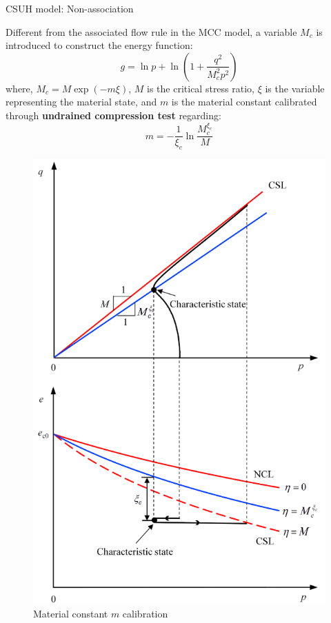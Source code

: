 \documentclass[aspectratio=169]{beamer}
\begin{document}
\begin{frame}{CSUH model: Non-association}
    \fontsize{10}{10}\selectfont
    \begin{minipage}[c]{0.50\linewidth}
        Different from the associated flow rule in the MCC model, a variable $M_c$ is introduced to construct the energy function:
    \begin{equation}
        g = \ln{p} + \ln{\left( 1+ \frac{q^2}{M_c^2 p^2}\right)}
        \label{eq: energy function in the CSUH model}
    \end{equation}
    where, $M_c=M\exp\left({-m\xi}\right)$, $M$ is the critical stress ratio, $\xi$ is the variable representing the material state, and $m$ is the material constant calibrated through \textbf{undrained compression test} regarding:
    \begin{equation}
        m=-\frac{1}{\xi_c}\ln{\frac{M_c^{\xi_c}}{M}}
        \label{eq: material constant m calibration}
    \end{equation}
    \end{minipage}
    \hspace{10mm}
    \begin{minipage}{0.4\linewidth}
        \begin{figure}
            \centering
            \includegraphics[width=0.7\linewidth]{./pic/m calibration.jpg}
            \caption{Material constant $m$ calibration}
            \label{fig: m calibration}
        \end{figure}
    \end{minipage}
\end{frame}
\end{document}
